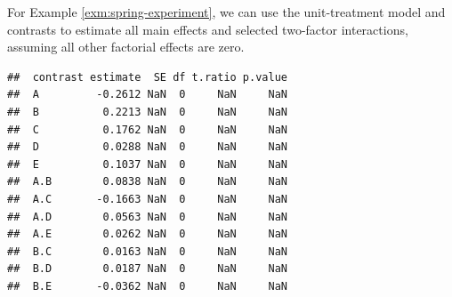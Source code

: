 \documentclass[
]{book}
\newenvironment{Shaded}{\begin{snugshade}}{\end{snugshade}}
\newcommand{\AttributeTok}[1]{\textcolor[rgb]{0.77,0.63,0.00}{#1}}
\newcommand{\ControlFlowTok}[1]{\textcolor[rgb]{0.13,0.29,0.53}{\textbf{#1}}}
\newcommand{\DecValTok}[1]{\textcolor[rgb]{0.00,0.00,0.81}{#1}}
\newcommand{\FunctionTok}[1]{\textcolor[rgb]{0.00,0.00,0.00}{#1}}
\newcommand{\NormalTok}[1]{#1}
\newcommand{\OtherTok}[1]{\textcolor[rgb]{0.56,0.35,0.01}{#1}}
\newcommand{\SpecialCharTok}[1]{\textcolor[rgb]{0.00,0.00,0.00}{#1}}
\newcommand{\StringTok}[1]{\textcolor[rgb]{0.31,0.60,0.02}{#1}}
\theoremstyle{definition}
\theoremstyle{definition}
\theoremstyle{definition}
\theoremstyle{definition}
\theoremstyle{remark}
\begin{document}
For Example \ref{exm:spring-experiment}, we can use the unit-treatment model and contrasts to estimate all main effects and selected two-factor interactions, assuming all other factorial effects are zero.

\begin{Shaded}
\end{Shaded}

\begin{verbatim}
##  contrast estimate  SE df t.ratio p.value
##  A         -0.2612 NaN  0     NaN     NaN
##  B          0.2213 NaN  0     NaN     NaN
##  C          0.1762 NaN  0     NaN     NaN
##  D          0.0288 NaN  0     NaN     NaN
##  E          0.1037 NaN  0     NaN     NaN
##  A.B        0.0838 NaN  0     NaN     NaN
##  A.C       -0.1663 NaN  0     NaN     NaN
##  A.D        0.0563 NaN  0     NaN     NaN
##  A.E        0.0262 NaN  0     NaN     NaN
##  B.C        0.0163 NaN  0     NaN     NaN
##  B.D        0.0187 NaN  0     NaN     NaN
##  B.E       -0.0362 NaN  0     NaN     NaN
\end{verbatim}
\end{document}
